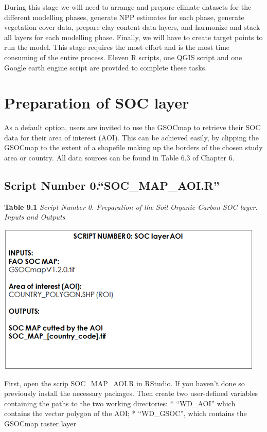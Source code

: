 \documentclass[
  10pt,
  b5paper,
]{book}
\begin{document}
During this stage we will need to arrange and prepare climate datasets for the different modelling phases, generate NPP estimates for each phase, generate vegetation cover data, prepare clay content data layers, and harmonize and stack all layers for each modelling phase. Finally, we will have to create target points to run the model. This stage requires the most effort and is the most time consuming of the entire process. Eleven R scripts, one QGIS script and one Google earth engine script are provided to complete these tasks.

\hypertarget{preparation-of-soc-layer}{%
\section{Preparation of SOC layer}\label{preparation-of-soc-layer}}

As a default option, users are invited to use the GSOCmap to retrieve their SOC data for their area of interest (AOI). This can be achieved easily, by clipping the GSOCmap to the extent of a shapefile making up the borders of the chosen study area or country. All data sources can be found in Table 6.3 of Chapter 6.

\hypertarget{script-number-0.soc_map_aoi.r}{%
\subsection{Script Number 0.``SOC\_MAP\_AOI.R''}\label{script-number-0.soc_map_aoi.r}}

\textbf{Table 9.1} \emph{Script Number 0. Preparation of the Soil Organic Carbon SOC layer. Inputs and Outputs}

\includegraphics{tables/Table_9.0.png}

First, open the scrip SOC\_MAP\_AOI.R in RStudio. If you haven't done so previously install the necessary packages. Then create two user-defined variables containing the paths to the two working directories:
* ``WD\_AOI'' which contains the vector polygon of the AOI;
* ``WD\_GSOC'', which contains the GSOCmap raster layer
\end{document}
